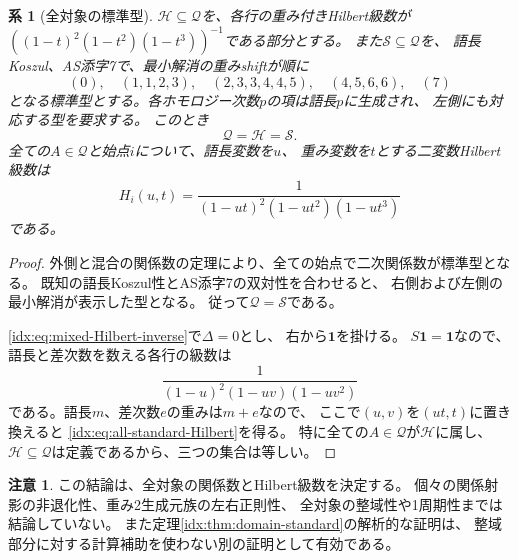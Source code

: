 \documentclass[11pt,a4paper]{ltjsarticle}
\newtheorem{corollary}[theorem]{系}
\theoremstyle{definition}
\newtheorem{remark}[theorem]{注意}
\begin{document}
\begin{corollary}[全対象の標準型]
\label{idx:cor:all-standard}
$\mathcal H\subseteq\mathcal Q$を、各行の重み付きHilbert級数が
$((1-t)^2(1-t^2)(1-t^3))^{-1}$である部分とする。
また$\mathcal S\subseteq\mathcal Q$を、
語長Koszul、AS添字7で、最小解消の重みshiftが順に
\[
(0),\quad(1,1,2,3),\quad(2,3,3,4,4,5),\quad
(4,5,6,6),\quad(7)
\]
となる標準型とする。各ホモロジー次数$p$の項は語長$p$に生成され、
左側にも対応する型を要求する。
このとき
\[
\mathcal Q=\mathcal H=\mathcal S.
\]
全ての$A\in\mathcal Q$と始点$i$について、語長変数を$u$、
重み変数を$t$とする二変数Hilbert級数は
\begin{equation}\label{idx:eq:all-standard-Hilbert}
H_i(u,t)=
\frac1{(1-ut)^2(1-ut^2)(1-ut^3)}
\end{equation}
である。
\end{corollary}
\begin{proof}
外側と混合の関係数の定理により、全ての始点で二次関係数が標準型となる。
既知の語長Koszul性とAS添字7の双対性を合わせると、
右側および左側の最小解消が表示した型となる。
従って$\mathcal Q=\mathcal S$である。

\eqref{idx:eq:mixed-Hilbert-inverse}で$\Delta=0$とし、
右から$\mathbf1$を掛ける。
$S\mathbf1=\mathbf1$なので、語長と差次数を数える各行の級数は
\[
\frac1{(1-u)^2(1-uv)(1-uv^2)}
\]
である。語長$m$、差次数$e$の重みは$m+e$なので、
ここで$(u,v)$を$(ut,t)$に置き換えると
\eqref{idx:eq:all-standard-Hilbert}を得る。
特に全ての$A\in\mathcal Q$が$\mathcal H$に属し、
$\mathcal H\subseteq\mathcal Q$は定義であるから、三つの集合は等しい。
\end{proof}

\begin{remark}
この結論は、全対象の関係数とHilbert級数を決定する。
個々の関係射影の非退化性、重み2生成元族の左右正則性、
全対象の整域性や1周期性までは結論していない。
また定理\ref{idx:thm:domain-standard}の解析的な証明は、
整域部分に対する計算補助を使わない別の証明として有効である。
\end{remark}
\end{document}
